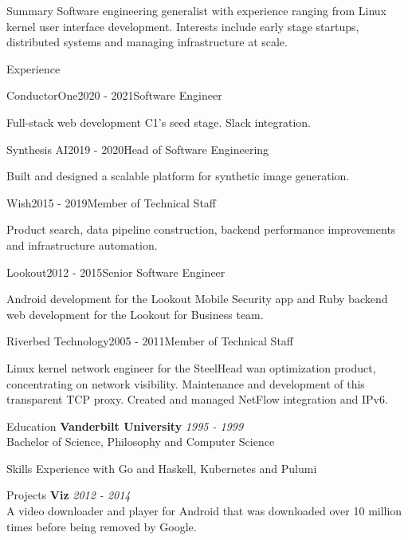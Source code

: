 \documentclass{resume} %
\begin{document}
\begin{rSection}{Summary}
Software engineering generalist with experience ranging from Linux kernel user interface development. Interests include
early stage startups, distributed systems and managing infrastructure at scale.
\end{rSection}

\begin{rSection}{Experience}

\begin{rSubsection}{ConductorOne}{2020 - 2021}{Software Engineer}{}
\item Full-stack web development C1's seed stage. Slack integration.
\end{rSubsection}

\begin{rSubsection}{Synthesis AI}{2019 - 2020}{Head of Software Engineering}{}
\item Built and designed a scalable platform for synthetic image generation.
\end{rSubsection}

\begin{rSubsection}{Wish}{2015 - 2019}{Member of Technical Staff}{}
\item Product search, data pipeline construction, backend performance improvements and infrastructure automation.
\end{rSubsection}

\begin{rSubsection}{Lookout}{2012 - 2015}{Senior Software Engineer}{}
\item Android development for the Lookout Mobile Security app and Ruby backend web development for the Lookout for Business team.
\end{rSubsection}

\begin{rSubsection}{Riverbed Technology}{2005 - 2011}{Member of Technical Staff}{}
\item Linux kernel network engineer for the SteelHead wan optimization product, concentrating on network visibility.
Maintenance and development of this transparent TCP proxy. Created and managed NetFlow integration and IPv6.
\end{rSubsection}

\end{rSection}


\begin{rSection}{Education}
{\bf Vanderbilt University} \hfill {\em 1995 - 1999}
\\ Bachelor of Science, Philosophy and Computer Science
\end{rSection}


\begin{rSection}{Skills}
Experience with Go and Haskell, Kubernetes and Pulumi
\end{rSection}

\begin{rSection}{Projects}
	{\bf Viz} \hfill {\em 2012 - 2014}
\\ A video downloader and player for Android that was downloaded over 10 million times before being removed by Google.
\end{rSection}
\end{document}
